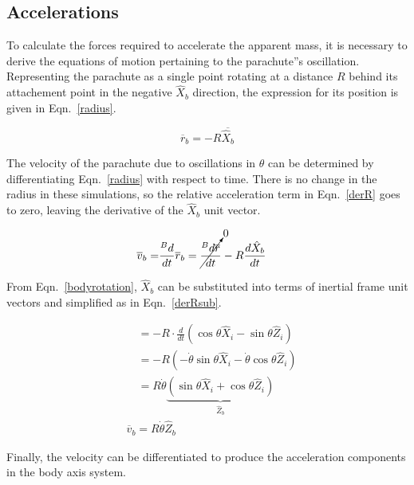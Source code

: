 \documentclass[]{aiaa-tc}%
\begin{document}
\subsection{Accelerations}

To calculate the forces required to accelerate the apparent mass, it is necessary to derive the equations of motion pertaining to the parachute''s oscillation.  Representing the parachute as a single point rotating at a distance $R$ behind its attachement point in the negative $\hat{X}_b$ direction, the expression for its position is given in Eqn.~\ref{radius}.

\begin{equation} \label{radius}
  \overline{r}_b = -R \overline{\hat{X}_b}
\end{equation}

\noindent The velocity of the parachute due to oscillations in $\theta$ can be determined by differentiating Eqn.~\ref{radius} with respect to time.  There is no change in the radius in these simulations, so the relative acceleration term in Eqn.~\ref{derR} goes to zero, leaving the derivative of the $\hat{X}_b$ unit vector.

\begin{equation} \label{derR}
\begin{split}
  \overline{v}_b =& \frac{^Bd}{dt} \overline{r}_b = \cancelto{0}{\frac{^Bd\overline{r}}{dt}} - R \frac{d\hat{X}_b}{dt}
\end{split}
\end{equation}

\noindent From Eqn.~\ref{bodyrotation}, $\hat{X}_b$ can be substituted into terms of inertial frame unit vectors and simplified as in Eqn.~\ref{derRsub}.

\begin{equation} \label{derRsub}
\begin{split}
  &\quad= -R \cdot \frac{d}{dt} \left( \cos\theta\hat{X}_i - \sin\theta\hat{Z}_i  \right) \\
  &\quad= -R \left( -\dot{\theta}\sin\theta\hat{X}_i - \dot{\theta}\cos\theta\hat{Z}_i \right) \\
  &\quad= R\dot{\theta} \underbrace{ \left( \sin\theta\hat{X}_i + \cos\theta\hat{Z}_i \right) }_{\hat{Z}_b} \\
  &\boxed{\overline{v}_b = R\dot{\theta}\hat{Z}_b}
\end{split}
\end{equation}

\noindent Finally, the velocity can be differentiated to produce the acceleration components in the body axis system.
\end{document}
